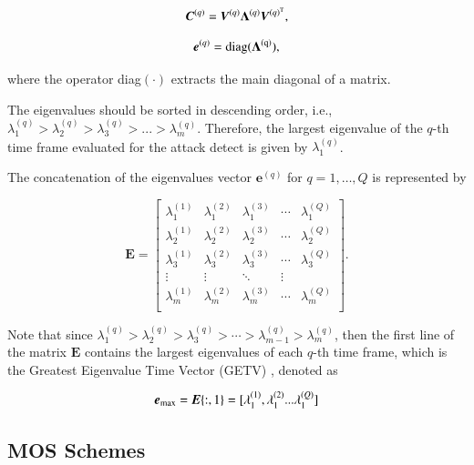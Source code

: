 \documentclass[review]{elsarticle}
\begin{document}
\begin{equation}\label{eq:eq06}
\boldsymbol{C}^{(q)} = \boldsymbol{V}^{(q)}\boldsymbol{\Lambda}^{(q)}\boldsymbol{V}^{(q)^{\rm T}},
\end{equation}

\begin{equation}\label{eq:eq060}
\boldsymbol{e}^{(q)} = \rm diag(\boldsymbol{\Lambda}^{(q)}),
\end{equation}

where the operator diag$(\cdot)$ extracts the main diagonal of a matrix.

The eigenvalues should be sorted in descending order, i.e., $\lambda_{1}^{(q)} > \lambda_{2}^{(q)} > \lambda_{3}^{(q)} > ... > \lambda_{m}^{(q)}$. Therefore, the largest eigenvalue of the $q$-th time frame evaluated for the attack detect is given by $\lambda_{1}^{(q)}$.

The concatenation of the eigenvalues vector $\boldsymbol{e}^{(q)}$ for $q = 1, \ldots, Q$ is represented by

\begin{equation}\label{eq:eq07}
\boldsymbol{E} =
\begin{bmatrix}
  \lambda_1^{(1)} & \lambda_1^{(2)} & \lambda_1^{(3)} & \cdots & \lambda_1^{(Q)} \\
  \lambda_2^{(1)} & \lambda_2^{(2)} & \lambda_2^{(3)} & \cdots & \lambda_2^{(Q)} \\
  \lambda_3^{(1)} & \lambda_3^{(2)} & \lambda_3^{(3)} & \cdots & \lambda_3^{(Q)} \\
  \vdots & \vdots & \ddots & \vdots  \\
  \lambda_m^{(1)} & \lambda_m^{(2)} & \lambda_m^{(3)} & \cdots & \lambda_m^{(Q)} \\
\end{bmatrix}.
\end{equation}

Note that since $\lambda_1^{(q)} > \lambda_2^{(q)} > \lambda_3^{(q)} > \cdots > \lambda_{m-1}^{(q)} > \lambda_m^{(q)}$, then the first line of the matrix $\boldsymbol{E}$ contains the largest eigenvalues of each $q$-th time frame, which is the Greatest Eigenvalue Time
Vector (GETV) \cite{tenorio2013greatest}, denoted as 

\begin{equation}\label{eq:eq08}
\boldsymbol{e}_{\rm max} = \boldsymbol{E}\{:,1\} = [ \lambda_1^{(1)}, \lambda_1^{(2)} ... \lambda_1^{(Q)}]
\end{equation}

\subsection{MOS Schemes}
\label{sec:prop_MOSSchemes}
\end{document}
